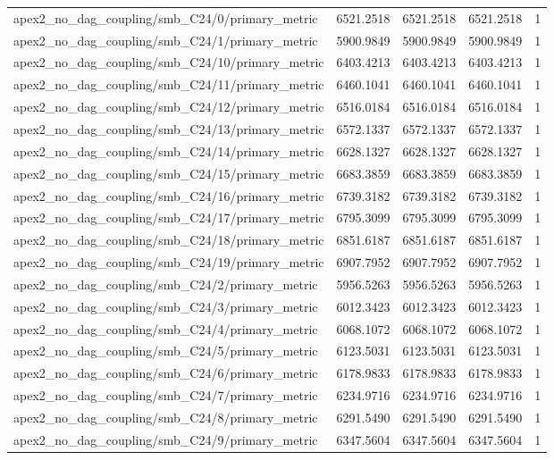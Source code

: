 \begin{table}[h]
\begin{tabular}{lrrrr}
apex2_no_dag_coupling/smb_C24/0/primary_metric & 6521.2518 & 6521.2518 & 6521.2518 & 1 \\
apex2_no_dag_coupling/smb_C24/1/primary_metric & 5900.9849 & 5900.9849 & 5900.9849 & 1 \\
apex2_no_dag_coupling/smb_C24/10/primary_metric & 6403.4213 & 6403.4213 & 6403.4213 & 1 \\
apex2_no_dag_coupling/smb_C24/11/primary_metric & 6460.1041 & 6460.1041 & 6460.1041 & 1 \\
apex2_no_dag_coupling/smb_C24/12/primary_metric & 6516.0184 & 6516.0184 & 6516.0184 & 1 \\
apex2_no_dag_coupling/smb_C24/13/primary_metric & 6572.1337 & 6572.1337 & 6572.1337 & 1 \\
apex2_no_dag_coupling/smb_C24/14/primary_metric & 6628.1327 & 6628.1327 & 6628.1327 & 1 \\
apex2_no_dag_coupling/smb_C24/15/primary_metric & 6683.3859 & 6683.3859 & 6683.3859 & 1 \\
apex2_no_dag_coupling/smb_C24/16/primary_metric & 6739.3182 & 6739.3182 & 6739.3182 & 1 \\
apex2_no_dag_coupling/smb_C24/17/primary_metric & 6795.3099 & 6795.3099 & 6795.3099 & 1 \\
apex2_no_dag_coupling/smb_C24/18/primary_metric & 6851.6187 & 6851.6187 & 6851.6187 & 1 \\
apex2_no_dag_coupling/smb_C24/19/primary_metric & 6907.7952 & 6907.7952 & 6907.7952 & 1 \\
apex2_no_dag_coupling/smb_C24/2/primary_metric & 5956.5263 & 5956.5263 & 5956.5263 & 1 \\
apex2_no_dag_coupling/smb_C24/3/primary_metric & 6012.3423 & 6012.3423 & 6012.3423 & 1 \\
apex2_no_dag_coupling/smb_C24/4/primary_metric & 6068.1072 & 6068.1072 & 6068.1072 & 1 \\
apex2_no_dag_coupling/smb_C24/5/primary_metric & 6123.5031 & 6123.5031 & 6123.5031 & 1 \\
apex2_no_dag_coupling/smb_C24/6/primary_metric & 6178.9833 & 6178.9833 & 6178.9833 & 1 \\
apex2_no_dag_coupling/smb_C24/7/primary_metric & 6234.9716 & 6234.9716 & 6234.9716 & 1 \\
apex2_no_dag_coupling/smb_C24/8/primary_metric & 6291.5490 & 6291.5490 & 6291.5490 & 1 \\
apex2_no_dag_coupling/smb_C24/9/primary_metric & 6347.5604 & 6347.5604 & 6347.5604 & 1 \\

\end{tabular}
\end{table}
